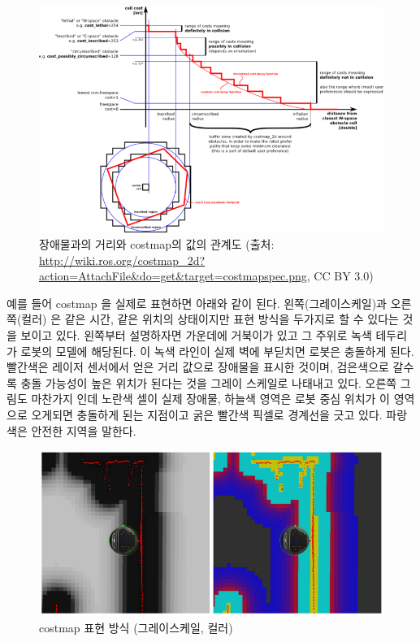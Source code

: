 \begin{figure}[h]
\centering
\includegraphics[width=\columnwidth]{pictures/chapter11/costmap_calculation.png}
\caption{장애물과의 거리와 costmap의 값의 관계도 (출처: \url{http://wiki.ros.org/costmap_2d?action=AttachFile&do=get&target=costmapspec.png}, CC BY 3.0)}
\end{figure}


예를 들어 costmap 을 실제로 표현하면 아래와 같이 된다. 왼쪽(그레이스케일)과 오른쪽(컬러) 은 같은 시간, 같은 위치의 상태이지만 표현 방식을 두가지로 할 수 있다는 것을 보이고 있다. 왼쪽부터 설명하자면 가운데에 거북이가 있고 그 주위로 녹색 테두리가 로봇의 모델에 해당된다. 이 녹색 라인이 실제 벽에 부딛치면 로봇은 충돌하게 된다. 빨간색은 레이저 센서에서 얻은 거리 값으로 장애물을 표시한 것이며, 검은색으로 갈수록 충돌 가능성이 높은 위치가 된다는 것을 그레이 스케일로 나태내고 있다. 오른쪽 그림도 마찬가지 인데 노란색 셀이 실제 장애물, 하늘색 영역은 로봇 중심 위치가 이 영역으로 오게되면 충돌하게 된는 지점이고 굵은 빨간색 픽셀로 경계선을 긋고 있다. 파랑색은 안전한 지역을 말한다.

\begin{figure}[h]
\centering
\includegraphics[width=0.8\columnwidth]{pictures/chapter11/costmap_gray.png}
\caption{costmap 표현 방식 (그레이스케일, 컬러)}
\end{figure}

